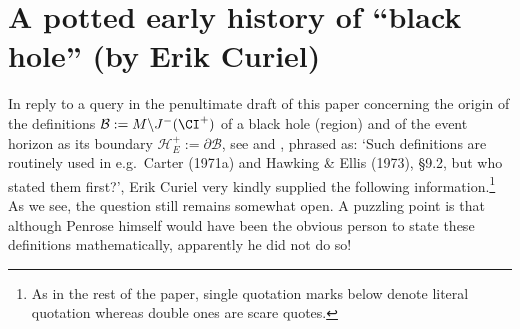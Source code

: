 \documentclass[12pt]{article}
\newcommand{\p}{\partial}
\begin{document}
\section{A potted early history of ``black hole'' (by Erik Curiel)} 
In reply to a query in the penultimate draft of this paper concerning  the origin of the definitions $\mathcal{B}:= M\backslash J^-(\CI^+)$ of a black hole (region) and of the event horizon as its boundary $\mathcal{H}_E^+:=\p \mathcal{B}$, see 
 and , phrased as: `Such definitions are routinely used in e.g.\ Carter (1971a) and Hawking \& Ellis (1973), \S 9.2, but who stated them first?',  Erik Curiel very kindly supplied the following information.\footnote{As in the rest of the paper, single quotation marks below denote literal quotation whereas double ones are scare quotes.}  As we see, the question still remains somewhat open. A puzzling point is that
although Penrose himself would have been the obvious person to state these definitions mathematically, apparently he did not do so!
\end{document}
